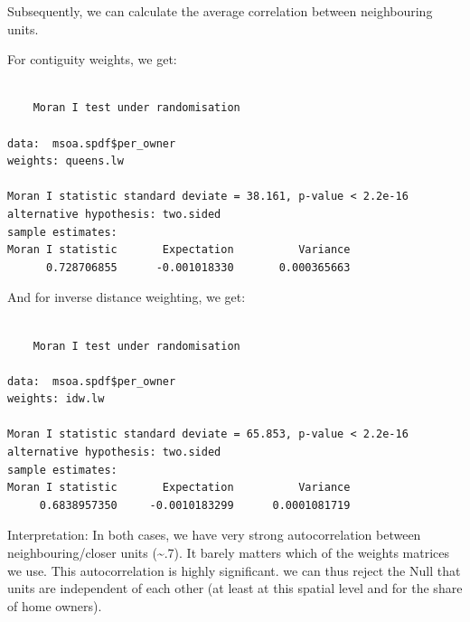 \documentclass[
  letterpaper,
]{scrbook}
\newenvironment{Shaded}{\begin{snugshade}}{\end{snugshade}}
\newcommand{\AttributeTok}[1]{\textcolor[rgb]{0.40,0.45,0.13}{#1}}
\newcommand{\CommentTok}[1]{\textcolor[rgb]{0.37,0.37,0.37}{#1}}
\newcommand{\FunctionTok}[1]{\textcolor[rgb]{0.28,0.35,0.67}{#1}}
\newcommand{\NormalTok}[1]{\textcolor[rgb]{0.00,0.23,0.31}{#1}}
\newcommand{\SpecialCharTok}[1]{\textcolor[rgb]{0.37,0.37,0.37}{#1}}
\newcommand{\StringTok}[1]{\textcolor[rgb]{0.13,0.47,0.30}{#1}}
\begin{document}
Subsequently, we can calculate the average correlation between
neighbouring units.

For contiguity weights, we get:

\begin{Shaded}
\end{Shaded}

\begin{verbatim}

    Moran I test under randomisation

data:  msoa.spdf$per_owner  
weights: queens.lw    

Moran I statistic standard deviate = 38.161, p-value < 2.2e-16
alternative hypothesis: two.sided
sample estimates:
Moran I statistic       Expectation          Variance 
      0.728706855      -0.001018330       0.000365663 
\end{verbatim}

And for inverse distance weighting, we get:

\begin{Shaded}
\end{Shaded}

\begin{verbatim}

    Moran I test under randomisation

data:  msoa.spdf$per_owner  
weights: idw.lw    

Moran I statistic standard deviate = 65.853, p-value < 2.2e-16
alternative hypothesis: two.sided
sample estimates:
Moran I statistic       Expectation          Variance 
     0.6838957350     -0.0010183299      0.0001081719 
\end{verbatim}

Interpretation: In both cases, we have very strong autocorrelation
between neighbouring/closer units (\textasciitilde.7). It barely matters
which of the weights matrices we use. This autocorrelation is highly
significant. we can thus reject the Null that units are independent of
each other (at least at this spatial level and for the share of home
owners).
\end{document}
